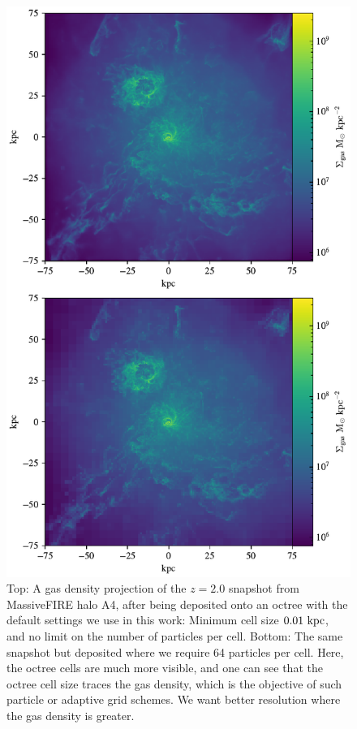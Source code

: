 \begin{figure}[H]
   \centering
    \includegraphics[width=\textwidth,height=0.85\textheight,keepaspectratio]{figures/octree_resolution.pdf}
    \caption{
        Top: A gas density projection of the $z = 2.0$ snapshot from MassiveFIRE halo A4, after being deposited onto an octree with the default settings we use in this work: Minimum cell size $0.01\ \rm{kpc}$, and no limit on the number of particles per cell.
        Bottom: The same snapshot but deposited where we require 64 particles per cell. Here, the octree cells are much more visible, and one can see that the octree cell size traces the gas density, which is the objective of such particle or adaptive grid schemes. We want better resolution where the gas density is greater.
    }
   \label{fig:octree_resolution}
\end{figure}

